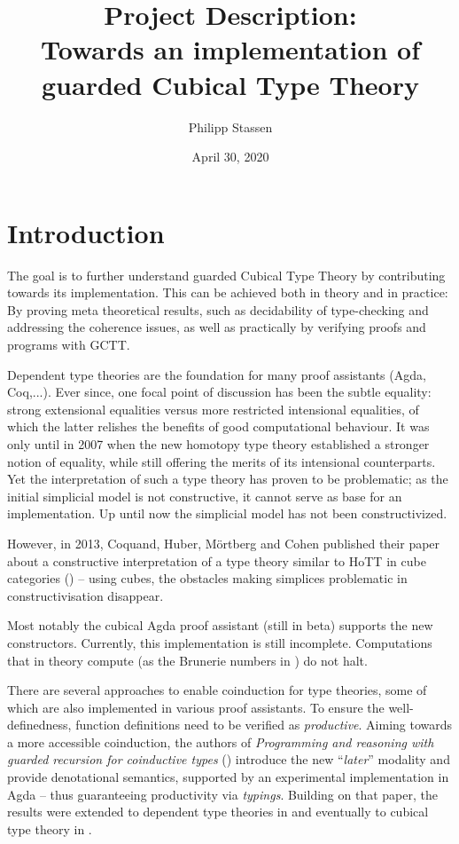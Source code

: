 \documentclass{article}
\date{April 30, 2020}
\title{Project Description: \\Towards an implementation of guarded Cubical Type Theory}
\author{Philipp Stassen}
\begin{document}
\maketitle
\vspace{2em}
\section{Introduction}
The goal is to further understand guarded Cubical Type Theory by contributing towards its implementation. This can be achieved both in theory and in practice: By proving meta theoretical results, such as decidability of type-checking and addressing the coherence issues, as well as practically by verifying proofs and programs with GCTT.

Dependent type theories are the foundation for many proof assistants (Agda, Coq,...).
Ever since, one focal point of discussion has been the subtle equality: strong extensional equalities versus more restricted intensional equalities, of which the latter relishes the benefits of good computational behaviour. It was only until in 2007 when the new homotopy type theory established a stronger notion of equality, while still offering the merits of its intensional counterparts.
Yet the interpretation of such a type theory has proven to be problematic; as the initial simplicial model is not constructive, it cannot serve as base for an implementation.
Up until now the simplicial model has not been constructivized.

However, in 2013, Coquand, Huber, Mörtberg and Cohen published their paper about a constructive interpretation of a type theory similar to HoTT in cube categories (\cite{cubicaltt}) – using cubes, the obstacles making simplices problematic in constructivisation disappear.

Most notably the cubical Agda proof assistant (still in beta) supports the new constructors. Currently, this implementation is still incomplete. Computations that in theory compute (as the Brunerie numbers in \cite{brunerie}) do not halt.

There are several approaches to enable coinduction for type theories, some of which are also implemented in various proof assistants.
To ensure the well-definedness, function definitions need to be verified as \emph{productive}.
Aiming towards a more accessible coinduction, the authors of \emph{Programming and reasoning with guarded recursion for coinductive types} (\cite{GTT}) introduce the new ``\emph{later}'' modality and provide denotational semantics, supported by an experimental implementation in Agda – thus guaranteeing productivity via \emph{typings}.
Building on that paper, the results were extended to dependent type theories in \cite{GDTT} and eventually to cubical type theory in \cite{GCTT}.
\end{document}
